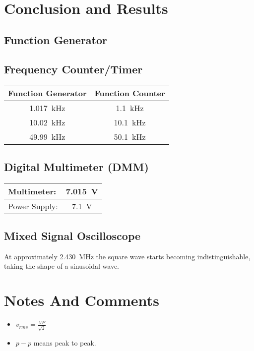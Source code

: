 \documentclass[12pt]{article}
\begin{document}
\section{Conclusion and Results}
\subsection{Function Generator}

\subsection{Frequency Counter/Timer}
\begin{center}
\begin{tabular}{ |c|c| }
    \hline
    \textbf{Function Generator} & \textbf{Function Counter} \\
    \hline
    \SI{1.017}{\kilo\hertz} & \SI{1.1}{\kilo\hertz} \\ %
    \SI{10.02}{\kilo\hertz} & \SI{10.1}{\kilo\hertz} \\ %
    \SI{49.99}{\kilo\hertz} & \SI{50.1}{\kilo\hertz} \\ %
    \hline
\end{tabular}
\end{center}

\subsection{Digital Multimeter (DMM)}
\begin{center}
\begin{tabular}{ |l c| }
    \hline
    Multimeter: & \SI{7.015}{\volt} \\
    \hline
    Power Supply: & \SI{7.1}{\volt} \\
    \hline
\end{tabular}
\end{center}

\subsection{Mixed Signal Oscilloscope}
At approximately \SI{2.430}{\mega\hertz} the square wave starts becoming indistinguishable, taking the shape of a sinusoidal wave.

\section{Notes And Comments}
\begin{itemize}
\item $v_{rms} = \frac{VP}{\sqrt{2}}$
\item $p - p$ means peak to peak.
\end{itemize}
\end{document}
